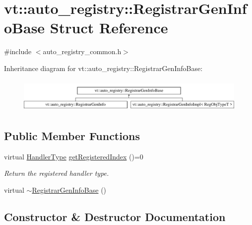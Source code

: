 \hypertarget{structvt_1_1auto__registry_1_1_registrar_gen_info_base}{}\section{vt\+:\+:auto\+\_\+registry\+:\+:Registrar\+Gen\+Info\+Base Struct Reference}
\label{structvt_1_1auto__registry_1_1_registrar_gen_info_base}


{\ttfamily \#include $<$auto\+\_\+registry\+\_\+common.\+h$>$}

Inheritance diagram for vt\+:\+:auto\+\_\+registry\+:\+:Registrar\+Gen\+Info\+Base\+:\begin{figure}[H]
\begin{center}
\leavevmode
\includegraphics[height=1.676647cm]{structvt_1_1auto__registry_1_1_registrar_gen_info_base}
\end{center}
\end{figure}
\subsection*{Public Member Functions}
\begin{DoxyCompactItemize}
\item 
virtual \hyperlink{namespacevt_af64846b57dfcaf104da3ef6967917573}{Handler\+Type} \hyperlink{structvt_1_1auto__registry_1_1_registrar_gen_info_base_ac498c953bb4a951399d66272cae76b05}{get\+Registered\+Index} ()=0
\begin{DoxyCompactList}\small\item\em Return the registered handler type. \end{DoxyCompactList}\item 
virtual \hyperlink{structvt_1_1auto__registry_1_1_registrar_gen_info_base_a39ece894c94aa15f384c9ddc46246fc7}{$\sim$\+Registrar\+Gen\+Info\+Base} ()
\end{DoxyCompactItemize}


\subsection{Constructor \& Destructor Documentation}
\mbox{\label{structvt_1_1auto__registry_1_1_registrar_gen_info_base_a39ece894c94aa15f384c9ddc46246fc7}} 
